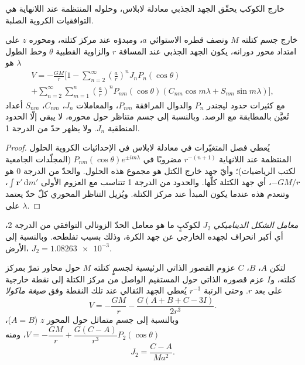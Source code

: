 خارج الكوكب يحقّق الجهد الجذبي معادلة لابلاس،
وحلوله المنتظمة عند اللانهاية هي التوافقيات الكروية الصلبة.

\begin{proposition}\label{prop:b3:gravity-geodesy:harmonics}
خارج جسم كتلته $M$ ونصف قطره الاستوائي $a$، ومبدؤه عند مركز كتلته،
ومحوره $z$ على امتداد محور دورانه، يكون الجهد الجذبي
عند المسافة $r$ والزاوية القطبية $\theta$ وخط الطول $\lambda$ هو
\begin{multline*}
  V = -\frac{GM}{r}\Biggl[1 - \sum_{n=2}^{\infty}\left(\frac ar\right)^nJ_nP_n(\cos\theta)\\
  + \sum_{n=2}^{\infty}\sum_{m=1}^{n}\left(\frac ar\right)^nP_{nm}(\cos\theta)
  (C_{nm}\cos m\lambda + S_{nm}\sin m\lambda)\Biggr],
\end{multline*}
مع كثيرات حدود ليجندر $P_n$ والدوال المرافقة $P_{nm}$، والمعاملات
$J_n$، $C_{nm}$، $S_{nm}$ أعداد تُعيَّن بالمطابقة مع الرصد. وبالنسبة إلى
جسم متناظر حول محوره، لا يبقى إلّا الحدود المنطقية $J_n$. ولا يظهر حدّ
من الدرجة 1.
\end{proposition}

\begin{proof}
يُعطي فصل المتغيّرات في معادلة لابلاس في الإحداثيات الكروية
الحلول المنتظمة عند اللانهاية $r^{-(n+1)}$ مضروبًا في $P_{nm}(\cos\theta)e^{\pm
im\lambda}$ (المجلّدات الجامعية لكتب الرياضيات)؛ وأيّ جهد خارج
الكتل هو مجموع هذه الحلول. والحدّ من الدرجة 0 هو $-GM/r$، أي جهد
الكتلة كلّها. والحدود من الدرجة 1 تتناسب مع العزوم الأولى
$\int\mathbf r'\,\mathrm dm'$، وتنعدم هذه عندما يكون المبدأ عند مركز
الكتلة. ويُزيل التناظر المحوري كلّ حدّ يعتمد على $\lambda$.
\end{proof}

\begin{definition}\label{def:b3:gravity-geodesy:j2}
\emph{معامل الشكل الديناميكي} $J_2$ لكوكبٍ ما
هو معامل الحدّ الزونالي التوافقي من الدرجة 2، أي أكبر انحراف لجهده الخارجي
عن جهد الكرة، وذلك بسبب تفلطحه. وبالنسبة إلى
الأرض، $J_2 = \num{1.08263e-3}$.
\end{definition}

\begin{theorem}\label{thm:b3:gravity-geodesy:maccullagh}
لتكن $A$، $B$، $C$ عزوم القصور الذاتي الرئيسية لجسمٍ كتلته $M$
حول محاور تمرّ بمركز كتلته، و$I$ عزم قصوره الذاتي حول
المستقيم الواصل من مركز الكتلة إلى نقطة خارجية على بعد $r$. وحتى الرتبة
$r^{-3}$ يُعطى الجهد الثقالي عند تلك النقطة وفق
\emph{صيغة ماكولا}
\[
  V = -\frac{GM}{r} - \frac{G(A + B + C - 3I)}{2r^3} .
\]
وبالنسبة إلى جسم متماثل حول المحور $z$ ($A = B$)،
$V = -\dfrac{GM}{r} + \dfrac{G(C - A)}{r^3}P_2(\cos\theta)$، ومنه
\[
  J_2 = \frac{C - A}{Ma^2} .
\]
\end{theorem}

